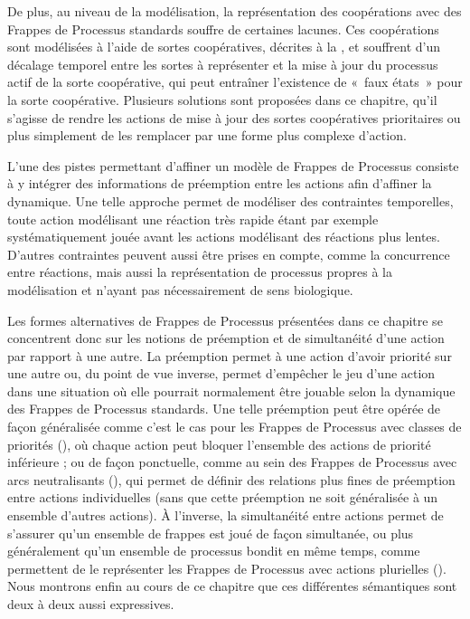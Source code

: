 De plus, au niveau de la modélisation, la représentation des coopérations avec des Frappes de
Processus standards souffre de certaines lacunes.
Ces coopérations sont modélisées à l'aide de sortes coopératives, décrites à la ,
et souffrent d'un décalage temporel entre les sortes à représenter et
la mise à jour du processus actif de la sorte coopérative,
qui peut entraîner l'existence de «~faux états~» pour la sorte coopérative.
Plusieurs solutions sont proposées dans ce chapitre, qu'il s'agisse de rendre les actions de mise à
jour des sortes coopératives prioritaires ou plus simplement de les remplacer par une forme plus
complexe d'action.

L'une des pistes permettant d'affiner un modèle de Frappes de Processus consiste à y intégrer
des informations de préemption entre les actions afin d'affiner la dynamique.
Une telle approche permet de modéliser des contraintes temporelles,
toute action modélisant une réaction très rapide étant par exemple systématiquement jouée
avant les actions modélisant des réactions plus lentes.
D'autres contraintes peuvent aussi être prises en compte, comme la concurrence entre réactions,
mais aussi la représentation de processus propres à la modélisation et n'ayant pas nécessairement
de sens biologique.

Les formes alternatives de Frappes de Processus présentées dans ce chapitre se concentrent donc
sur les notions de préemption et de simultanéité d'une action par rapport à une autre.
La préemption permet à une action d'avoir priorité sur une autre ou, du point de vue inverse,
permet d'empêcher le jeu d'une action dans une situation où elle pourrait normalement être jouable
selon la dynamique des Frappes de Processus standards.
Une telle préemption peut être opérée de façon généralisée
comme c'est le cas pour les Frappes de Processus avec classes de priorités (),
où chaque action peut bloquer l'ensemble des actions de priorité inférieure ;
ou de façon ponctuelle, comme au sein des Frappes de Processus avec arcs neutralisants
(),
qui permet de définir des relations plus fines de préemption entre actions individuelles
(sans que cette préemption ne soit généralisée à un ensemble d'autres actions).
À l'inverse, la simultanéité entre actions permet de s'assurer qu'un ensemble de frappes est joué
de façon simultanée, ou plus généralement qu'un ensemble de processus bondit en même temps,
comme permettent de le représenter les Frappes de Processus avec actions plurielles ().
Nous montrons enfin au cours de ce chapitre que ces différentes sémantiques sont deux à deux aussi
expressives.

